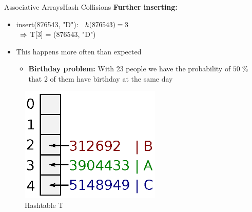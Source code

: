 \begin{frame}{Associative Arrays}{Hash Collisions}
  \textbf{Further inserting:}
  \begin{itemize}
    \item<1->
      insert(876543, "D"):
      $\hspace*{0.5em} h(876543) = 3$\\
      $\hspace*{0.5em} \Rightarrow$
      T[3] = (876543, "D") {\color{red}{COLLISION!}}
    \item<3->
      This happens more often than expected
      \begin{itemize}
        \item
          \textbf{Birthday problem:}
          With 23 people we have the probability of $50\;\%$ that 2 of
          them have birthday at the same day
      \end{itemize}
  \end{itemize}
  \vspace*{-1.0em}
  \begin{figure}
    \caption{Hashtable T}
    \centering
       \includegraphics[width=0.6\textwidth]{Images/Bucket4.eps}
  \end{figure}
\end{frame}


